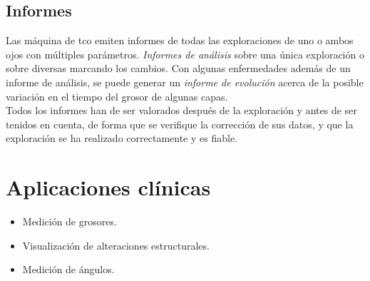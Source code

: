\subsection{Informes}
Las máquina de \gls{tco} emiten informes de todas las exploraciones de
uno o ambos ojos con múltiples parámetros. \emph{Informes de análisis}
sobre una única exploración o sobre diversas marcando los cambios. Con
algunas enfermedades además de un informe de análisis, se puede
generar un \emph{informe de evolución} acerca de la posible variación
en el tiempo del grosor de algunas capas.\\
Todos los informes han de ser valorados después de la exploración y
antes de ser tenidos en cuenta, de forma que se verifique la
corrección de sus datos, y que la exploración se ha realizado
correctamente y es fiable.

\section{Aplicaciones clínicas}
\begin{itemize}
\item Medición de grosores.
\item Visualización de alteraciones estructurales.
\item Medición de ángulos.
\end{itemize}

